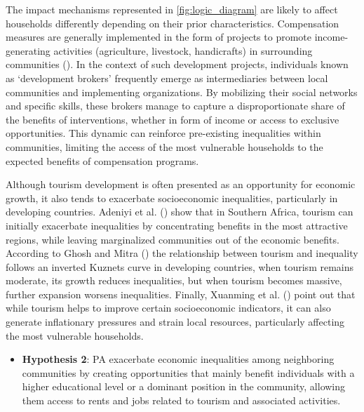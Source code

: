\documentclass[
]{article}
\providecommand{\tightlist}{%
  \setlength{\itemsep}{0pt}\setlength{\parskip}{0pt}}\usepackage{longtable,booktabs,array}
\begin{document}
The impact mechanisms represented in \autoref{fig:logic_diagram} are
likely to affect households differently depending on their prior
characteristics. Compensation measures are generally implemented in the
form of projects to promote income-generating activities (agriculture,
livestock, handicrafts) in surrounding communities
(). In the
context of such development projects, individuals known as `development
brokers' frequently emerge as intermediaries between local communities
and implementing organizations. By mobilizing their social networks and
specific skills, these brokers manage to capture a disproportionate
share of the benefits of interventions, whether in form of income or
access to exclusive opportunities. This dynamic can reinforce
pre-existing inequalities within communities, limiting the access of the
most vulnerable households to the expected benefits of compensation
programs.

Although tourism development is often presented as an opportunity for
economic growth, it also tends to exacerbate socioeconomic inequalities,
particularly in developing countries. Adeniyi et al.
() show that in Southern
Africa, tourism can initially exacerbate inequalities by concentrating
benefits in the most attractive regions, while leaving marginalized
communities out of the economic benefits. According to Ghosh and Mitra
() the relationship between
tourism and inequality follows an inverted Kuznets curve in developing
countries, when tourism remains moderate, its growth reduces
inequalities, but when tourism becomes massive, further expansion
worsens inequalities. Finally, Xuanming et al.
() point out that while tourism
helps to improve certain socioeconomic indicators, it can also generate
inflationary pressures and strain local resources, particularly
affecting the most vulnerable households.

\begin{itemize}
\tightlist
\item
  \textbf{Hypothesis 2}: PA exacerbate economic inequalities among
  neighboring communities by creating opportunities that mainly benefit
  individuals with a higher educational level or a dominant position in
  the community, allowing them access to rents and jobs related to
  tourism and associated activities.
\end{itemize}
\end{document}
